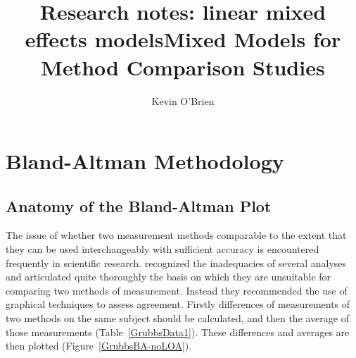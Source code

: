\documentclass[12pt, a4paper]{report}
\title{Research notes: linear mixed effects models}
\author{ } \date{ }
\theoremstyle{plain}
\theoremstyle{definition}
\theoremstyle{remark}
\begin{document}
	\author{Kevin O'Brien}
	\title{Mixed Models for Method Comparison Studies}
	\tableofcontents
	
	\newpage
	\chapter{Bland-Altman Methodology}
	\section{Anatomy of the Bland-Altman Plot}
	
	The issue of whether two measurement methods comparable to the 	extent that they can be used interchangeably with sufficient accuracy is encountered frequently in scientific research. \citet{BA83} recognized the inadequacies of several analyses and articulated quite thoroughly the basis on which they are unsuitable for comparing two methods of measurement. Instead they recommended the use of graphical techniques to assess agreement. Firstly differences of measurements of two methods on the same subject should  be calculated, and then the average of those measurements
(Table~\ref{GrubbsData1}). These differences and averages are then plotted (Figure~\ref{GrubbsBA-noLOA}).

		
\end{document}
